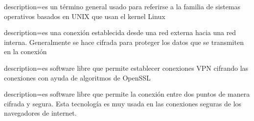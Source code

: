  { description={es un término general usado para referirse a la familia de sistemas operativos basados en UNIX que usan el kernel Linux}}

 { description={es una conexión establecida desde una red externa hacia una red interna. Generalmente se hace cifrada para proteger los datos que se transmiten en la conexión}}

 { description={es software libre que permite establecer conexiones VPN cifrando las conexiones con ayuda de algoritmos de OpenSSL}}

 { description={es software libre que permite la conexión entre dos puntos de manera cifrada y segura. Esta tecnología es muy usada en las conexiones seguras de los navegadores de internet.}}
